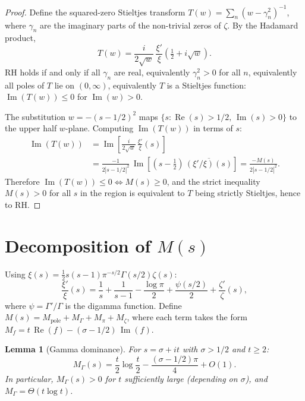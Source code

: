 \documentclass[11pt,a4paper]{article}
\newtheorem{lemma}{Lemma}
\DeclareMathOperator{\re}{Re}
\DeclareMathOperator{\im}{Im}
\begin{document}
\begin{proof}
Define the squared-zero Stieltjes transform
$T(w) = \sum_n (w - \gamma_n^2)^{-1}$, where $\gamma_n$ are the
imaginary parts of the non-trivial zeros of $\zeta$. By the
Hadamard product,
\[
  T(w) = \frac{i}{2\sqrt{w}}\,\frac{\xi'}{\xi}
    \!\left(\tfrac{1}{2} + i\sqrt{w}\right).
\]
RH holds if and only if all $\gamma_n$ are real, equivalently
$\gamma_n^2 > 0$ for all $n$, equivalently all poles of $T$ lie on
$(0,\infty)$, equivalently $T$ is a Stieltjes function:
$\im(T(w)) \leq 0$ for $\im(w) > 0$.

The substitution $w = -(s - 1/2)^2$ maps $\{s : \re(s) > 1/2,\,
\im(s) > 0\}$ to the upper half $w$-plane. Computing
$\im(T(w))$ in terms of $s$:
\begin{align*}
  \im(T(w)) &= \im\!\left[\frac{i}{2\sqrt{w}}\,
    \frac{\xi'}{\xi}(s)\right] \\
  &= \frac{-1}{2|s-1/2|^2}\,\im\!\left[
    (s-\tfrac{1}{2})\,\overline{(\xi'/\xi)(s)}\right]
  = \frac{-M(s)}{2|s-1/2|^2}.
\end{align*}
Therefore $\im(T(w)) \leq 0 \iff M(s) \geq 0$, and the strict
inequality $M(s) > 0$ for all $s$ in the region is equivalent to
$T$ being strictly Stieltjes, hence to RH.
\end{proof}

\section{Decomposition of $M(s)$}

Using $\xi(s) = \tfrac{1}{2}s(s-1)\pi^{-s/2}\Gamma(s/2)\zeta(s)$:
\begin{equation}\label{eq:xi-decomp}
  \frac{\xi'}{\xi}(s) = \frac{1}{s} + \frac{1}{s-1}
    - \frac{\log\pi}{2} + \frac{\psi(s/2)}{2}
    + \frac{\zeta'}{\zeta}(s),
\end{equation}
where $\psi = \Gamma'/\Gamma$ is the digamma function. Define
$M(s) = M_{\mathrm{pole}} + M_\Gamma + M_\pi + M_\zeta$, where
each term takes the form
$M_f = t\,\re(f) - (\sigma-1/2)\,\im(f)$.

\begin{lemma}[Gamma dominance]\label{lem:gamma}
For $s = \sigma + it$ with $\sigma > 1/2$ and $t \geq 2$:
\begin{equation}\label{eq:M-gamma}
  M_\Gamma(s) = \frac{t}{2}\log\frac{t}{2}
    - \frac{(\sigma-1/2)\pi}{4} + O(1).
\end{equation}
In particular, $M_\Gamma(s) > 0$ for $t$ sufficiently large
(depending on $\sigma$), and $M_\Gamma = \Theta(t\log t)$.
\end{lemma}
\end{document}
